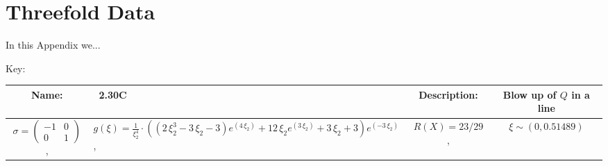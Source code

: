 \chapter{Threefold Data}
\label{appendix1}
\renewcommand{\thefootnote}{\fnsymbol{footnote}} 
\setcounter{footnote}{0}
In this Appendix we...

Key:

{\setlength{\parindent}{0pt}
\newpage
\begin{landscape}
%
%
%
%
%
%
%
%
%
%
%
%
%
\begin{tabularx}{\linewidth}{clcc}
\toprule
\midrule
\textbf{Name:} & \ 2.30C \hspace{0.3\linewidth} & \textbf{Description:} & Blow up of $Q$ in a line\\
\midrule
{\small $ \sigma = \begin{pmatrix} -1 & 0 \\ 0 & 1 \end{pmatrix}$ }, & \( g(\xi) = \frac{1}{\xi_{2}^{4}}\cdot\left({\left(2 \, \xi_{2}^{3} - 3 \, \xi_{2} - 3\right)} e^{\left(4 \, \xi_{2}\right)} + 12 \, \xi_{2} e^{\left(3 \, \xi_{2}\right)} + 3 \, \xi_{2} + 3\right) e^{\left(-3 \, \xi_{2}\right)} \), & $ R(X) = 23/29$ , & $\xi \sim (0,0.51489)$
\end{tabularx}
\begin{figure}[H]
\centering


\end{figure}
\end{landscape}}
